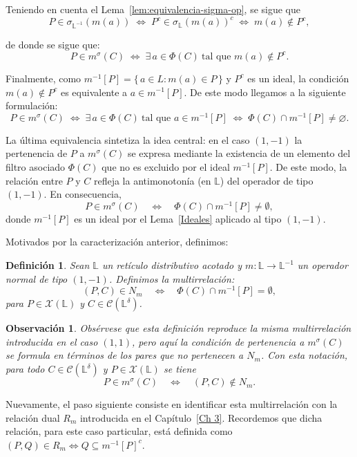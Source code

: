 \documentclass[12pt]{book}
\newtheorem{definition}[theorem]{Definición}
\newtheorem{remark}[theorem]{Observación}
\begin{document}
Teniendo en cuenta el Lema~\ref{lem:equivalencia-sigma-op}, se sigue que
\[
P\in\sigma_{\mathbb L^{-1}}(m(a))
\;\Longleftrightarrow\;
P^c\in\sigma_{\mathbb L}(m(a))^c
\;\Longleftrightarrow\;
m(a)\notin P^c,
\]

de donde se sigue que:
\[
P\in m^\sigma(C)
\;\Longleftrightarrow\;
\exists\,a\in\Phi(C)\ \text{tal que }
m(a)\notin P^c.
\]

Finalmente, como $m^{-1}[P]=\{\,a\in L:m(a)\in P\,\}$ y 
$P^c$ es un ideal, la condición 
$m(a)\notin P^c$ es equivalente a $a\in m^{-1}[P]$.  
De este modo llegamos a la siguiente formulación:
\[
P\in m^\sigma(C)
\;\Longleftrightarrow\;
\exists\,a\in\Phi(C)\ \text{tal que } a\in m^{-1}[P]
\;\Longleftrightarrow\;
\Phi(C)\cap m^{-1}[P]\neq\varnothing.
\]


\noindent
La última equivalencia sintetiza la idea central:
en el caso $(1,-1)$ la pertenencia de $P$ a $m^\sigma(C)$
se expresa mediante la existencia de un elemento del filtro asociado
$\Phi(C)$ que no es excluido por el ideal $m^{-1}[P]$.
De este modo, la relación entre $P$ y $C$ refleja la
antimonotonía (en $\mathbb{L}$)  del operador de tipo $(1,-1)$.
En consecuencia,
\[
P\in m^\sigma(C)
\quad\Longleftrightarrow\quad
\Phi(C)\cap m^{-1}[P]\neq\emptyset,
\]
donde
\(
m^{-1}[P]
\) es un ideal por el Lema~\ref{Ideales} aplicado al tipo $(1,-1)$.

\medskip

Motivados por la caracterización anterior, definimos:

\begin{definition}\label{def:Nm-1-1}
Sean $\mathbb{L}$ un retículo distributivo acotado y $m:\mathbb L\to\mathbb L^{-1}$ un operador normal de tipo $(1,-1)$. Definimos la multirrelación:
\[
(P,C)\in N_m
\quad\Longleftrightarrow\quad
\Phi(C)\cap m^{-1}[P]=\emptyset,
\]
para $P\in\mathcal X(\mathbb L)$ y $C\in\mathcal C(\mathbb L^\delta)$.
\end{definition}
\noindent
\begin{remark} \label{obs:C-noN}
Obsérvese que esta definición reproduce la misma multirrelación
introducida en el caso $(1,1)$, pero aquí la condición de pertenencia
a $m^\sigma(C)$ se formula en términos de los pares que \emph{no}
pertenecen a $N_m$. Con esta notación, para todo $C\in\mathcal C(\mathbb L^\delta)$ y $P\in\mathcal X(\mathbb L)$ se tiene
\[
P\in m^\sigma(C)
\quad\Longleftrightarrow\quad
(P,C)\notin N_m.
\]
\end{remark}

Nuevamente, el paso siguiente consiste en identificar esta multirrelación con la relación dual $R_m$ introducida en el Capítulo~\ref{Ch 3}. Recordemos que dicha relación, para este caso particular, está definida como $(P,Q)\in R_m\iff Q\subseteq m^{-1}[P]^c$.
\end{document}

